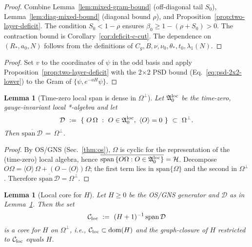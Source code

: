 \documentclass[11pt]{amsart}
\theoremstyle{plain}
\newtheorem{lemma}[theorem]{Lemma}
\theoremstyle{definition}
\theoremstyle{remark}
\begin{document}
\begin{proof}
Combine Lemma~\ref{lem:mixed-gram-bound} (off-diagonal tail $S_0$), Lemma~\ref{lem:diag-mixed-bound} (diagonal bound $\rho$), and Proposition~\ref{prop:two-layer-deficit}. The condition $S_0<1-\rho$ ensures $\beta_0\ge 1-(\rho+S_0)>0$. The contraction bound is Corollary~\ref{cor:deficit-c-cut}. The dependence on $(R_*,a_0,N)$ follows from the definitions of $C_g,B,\nu,\nu_0,\theta_*,t_0,\lambda_1(N)$.
\end{proof}

\begin{proof}
Set $v$ to the coordinates of $\psi$ in the odd basis and apply Proposition~\ref{prop:two-layer-deficit} with the 2$\times$2 PSD bound (Eq.~\eqref{eq:psd-2x2-lower}) to the Gram of $\{\psi,e^{-aH}\psi\}$.
\end{proof}

\medskip
\begin{lemma}[Time-zero local span is dense in $\Omega^{\perp}$]\label{lem:local-span-dense}
Let $\mathfrak{A}_0^{\rm loc}$ be the time-zero, gauge-invariant local *-algebra and let
\[
  \mathcal D\ :=\ \{\ O\,\Omega\ :\ O\in \mathfrak{A}_0^{\rm loc},\ \langle O\rangle=0\ \}\ \subset\ \Omega^{\perp}.
\]
Then $\overline{\mathrm{span}\,\mathcal D}\,=\,\Omega^{\perp}$.
\end{lemma}

\begin{proof}
By OS/GNS (Sec.~\ref{thm:os}), $\Omega$ is cyclic for the representation of the (time-zero) local algebra, hence $\overline{\mathrm{span}\,\{O\Omega: O\in \mathfrak{A}_0^{\rm loc}\}}=\mathcal H$. Decompose $O\Omega=\langle O\rangle\,\Omega+(O-\langle O\rangle)\Omega$; the first term lies in $\mathrm{span}\{\Omega\}$ and the second in $\Omega^{\perp}$. Therefore $\overline{\mathrm{span}\,\mathcal D}=\Omega^{\perp}$.
\end{proof}

\begin{lemma}[Local core for $H$]\label{lem:local-core}
Let $H\ge 0$ be the OS/GNS generator and $\mathcal D$ as in Lemma~\ref{lem:local-span-dense}. Then the set
\[
  \mathcal C_{\rm loc}\ :=\ (H+1)^{-1}\,\mathrm{span}\,\mathcal D
\]
is a core for $H$ on $\Omega^{\perp}$, i.e., $\mathcal C_{\rm loc}\subset\mathrm{dom}(H)$ and the graph-closure of $H$ restricted to $\mathcal C_{\rm loc}$ equals $H$.
\end{lemma}
\end{document}
